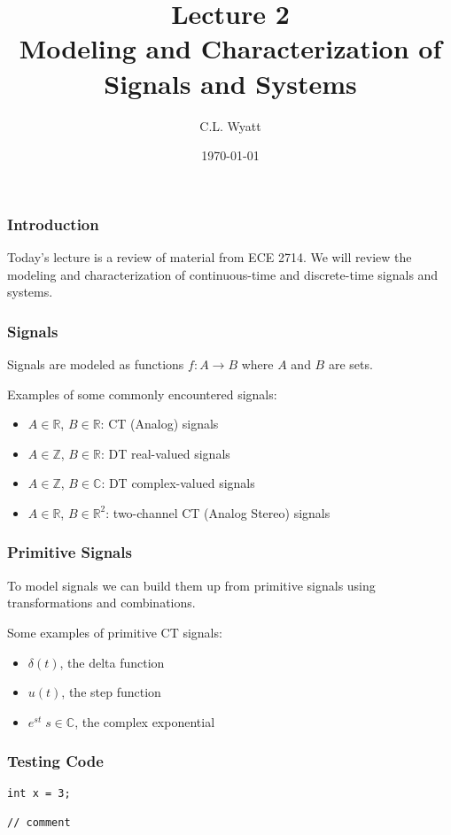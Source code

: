 \documentclass{beamer}
\begin{document}
\title{Lecture 2\\ Modeling and Characterization of Signals and Systems}
\author{C.L. Wyatt}
\date{\today}
\maketitle

\begin{frame}
  \frametitle{Introduction}

  Today's lecture is a review of material from ECE 2714. We will review the modeling and characterization of continuous-time and discrete-time signals and systems.

\end{frame}

\begin{frame}
  \frametitle{Signals}

  Signals are modeled as functions $f: A \rightarrow B$ where $A$ and $B$ are sets.

Examples of some commonly encountered signals:

\begin{itemize}
\item
  $A\in \mathbb{R}$, $B\in \mathbb{R}$: CT (Analog) signals
\item
  $A\in \mathbb{Z}$, $B\in \mathbb{R}$: DT real-valued signals
\item
  $A\in \mathbb{Z}$, $B\in \mathbb{C}$: DT complex-valued signals
\item
  $A\in \mathbb{R}$, $B\in \mathbb{R}^2$: two-channel CT (Analog Stereo) signals
\end{itemize}

\end{frame}

\begin{frame}
  \frametitle{Primitive Signals}

  To model signals we can build them up from primitive signals using transformations and combinations.

Some examples of primitive CT signals:

\begin{itemize}
\item
  $\delta(t)$, the delta function
\item
  $u(t)$, the step function
\item
  $e^{st}\; s\in\mathbb{C}$, the complex exponential
\end{itemize}

\end{frame}

\begin{frame}[fragile]
  \frametitle{Testing Code}

\begin{verbatim}
int x = 3;

// comment
\end{verbatim}


\end{frame}
\end{document}
